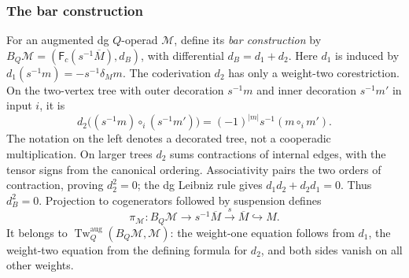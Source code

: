 \documentclass[11pt,letterpaper]{article}
\numberwithin{equation}{section}
\theoremstyle{plain}
\theoremstyle{definition}
\theoremstyle{remark}
\begin{document}
\subsubsection{The bar construction}
\label{subsec:fc_bar}
For an augmented dg $Q$-operad $\mathscr M$, define its \textit{bar construction} by $B_Q\mathscr M=(\mathsf F_c(s^{-1}\overline M),d_B)$, with differential $d_B=d_1+d_2$.
Here $d_1$ is induced by $d_1(s^{-1}m)=-s^{-1}\delta_Mm$. The coderivation $d_2$ has only a weight-two corestriction. On the two-vertex tree with outer decoration $s^{-1}m$ and inner decoration $s^{-1}m'$ in input $i$, it is
\begin{equation}\label{eq_bar_d2_corestriction}
 d_2\bigl((s^{-1}m)\circ_i(s^{-1}m')\bigr)
 =(-1)^{|m|}s^{-1}(m\circ_i m').
\end{equation}
The notation on the left denotes a decorated tree, not a cooperadic multiplication. On larger trees $d_2$ sums contractions of internal edges, with the tensor signs from the canonical ordering. Associativity pairs the two orders of contraction, proving $d_2^2=0$; the dg Leibniz rule gives $d_1d_2+d_2d_1=0$. Thus $d_B^2=0$.
Projection to cogenerators followed by suspension defines
\begin{equation}\label{eq_canonical_bar_map}
\pi_{\mathscr M}:B_Q\mathscr M\longrightarrow s^{-1}\overline M
 \xrightarrow{s}\overline M\hookrightarrow M.
\end{equation}
It belongs to $\operatorname{Tw}^{\mathrm{aug}}_Q(B_Q\mathscr M,\mathscr M)$: the weight-one equation follows from $d_1$, the weight-two equation from the defining formula for $d_2$, and both sides vanish on all other weights.
\end{document}
